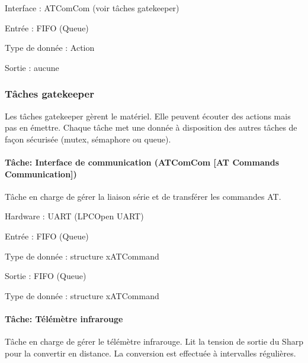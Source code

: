 Interface \-: A\-T\-Com\-Com (voir tâches gatekeeper)
\begin{DoxyItemize}
\item Entrée \-: F\-I\-F\-O (Queue)
\begin{DoxyItemize}
\item Type de donnée \-: Action
\end{DoxyItemize}
\item Sortie \-: aucune
\end{DoxyItemize}

\subsubsection*{Tâches gatekeeper}

Les tâches gatekeeper gèrent le matériel. Elle peuvent écouter des actions mais pas en émettre. Chaque tâche met une donnée à disposition des autres tâches de façon sécurisée (mutex, sémaphore ou queue).

\paragraph*{Tâche\-: Interface de communication (A\-T\-Com\-Com \mbox{[}A\-T Commands Communication\mbox{]})}

Tâche en charge de gérer la liaison série et de transférer les commandes A\-T.


\begin{DoxyItemize}
\item Hardware \-: U\-A\-R\-T (L\-P\-C\-Open U\-A\-R\-T)
\item Entrée \-: F\-I\-F\-O (Queue)
\begin{DoxyItemize}
\item Type de donnée \-: structure x\-A\-T\-Command
\end{DoxyItemize}
\item Sortie \-: F\-I\-F\-O (Queue)
\begin{DoxyItemize}
\item Type de donnée \-: structure x\-A\-T\-Command
\end{DoxyItemize}
\end{DoxyItemize}

\paragraph*{Tâche\-: Télémètre infrarouge}

Tâche en charge de gérer le télémètre infrarouge. Lit la tension de sortie du Sharp pour la convertir en distance. La conversion est effectuée à intervalles régulières.


